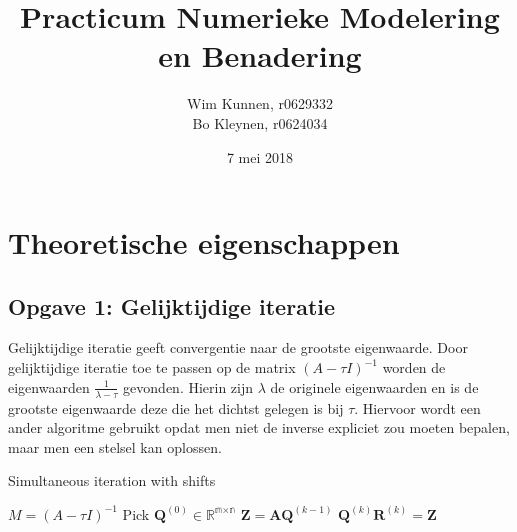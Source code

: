 \documentclass[a4paper]{article}
\title{Practicum Numerieke Modelering en Benadering}
\author{Wim Kunnen, r0629332 \\ Bo Kleynen, r0624034}
\date{7 mei 2018}
\newcommand{\opgave}[1]{\subsection{Opgave #1}}
\begin{document}
\begin{titlepage}
\maketitle
\thispagestyle{empty}
\end{titlepage}


\setcounter{page}{1}
\tableofcontents
\cleardoublepage

\listoffigures
{}

\listofalgorithms
{}

\cleardoublepage



\setcounter{page}{1}

\section{Theoretische eigenschappen}\label{sec:theorie}

\opgave{1: Gelijktijdige iteratie}\label{sec:oef1}

Gelijktijdige iteratie geeft convergentie naar de grootste eigenwaarde. Door gelijktijdige iteratie toe te passen op de matrix $(A-\tau I)^{-1}$ worden de eigenwaarden $\frac{1}{\lambda - \tau}$ gevonden. Hierin zijn $\lambda$ de originele eigenwaarden en is de grootste eigenwaarde deze die het dichtst gelegen is bij $\tau$. Hiervoor wordt een ander algoritme gebruikt opdat men niet de inverse expliciet zou moeten bepalen, maar men een stelsel kan oplossen.
\newline
\begin{algorithm}
\begin{algorithmic}[H]\label{alg:SI}\caption{Simultaneous iteration with shifts}
	\State $M = (A-\tau I)^{-1}$
	\State Pick $\textbf{\^{Q}}^{(0)} \in  \mathbb{R^{\text{m} \times \text{n}}}$
		\State $\textbf{Z} = \textbf{A}\textbf{\^{Q}}^{(k-1)}$
		\State$\textbf{\^{Q}}^{(k)}\textbf{\^{R}}^{(k)} = \textbf{Z}$
	\EndFor
\end{algorithmic}
\end{algorithm}
\end{document}

